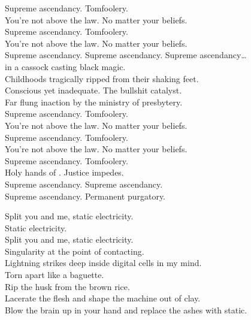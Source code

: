 Supreme ascendancy. Tomfoolery. \\
You're not above the law. No matter your beliefs. \\
Supreme ascendancy. Tomfoolery. \\
You're not above the law. No matter your beliefs. \\

Supreme ascendancy. Supreme ascendancy. Supreme ascendancy… \\

 in a cassock casting black magic. \\
Childhoods tragically ripped from their shaking feet. \\
Conscious yet inadequate. The bullshit catalyst. \\
Far flung inaction by the ministry of presbytery. \\

Supreme ascendancy. Tomfoolery. \\
You're not above the law. No matter your beliefs. \\
Supreme ascendancy. Tomfoolery. \\
You're not above the law. No matter your beliefs. \\
Supreme ascendancy. Tomfoolery. \\
Holy hands of . Justice impedes. \\

Supreme ascendancy. Supreme ascendancy. \\
Supreme ascendancy. Permanent purgatory. \\




Split you and me, static electricity. \\
Static electricity. \\
Split you and me, static electricity. \\

Singularity at the point of contacting. \\
Lightning strikes deep inside digital cells in my mind. \\
Torn apart like a baguette. \\
Rip the husk from the brown rice. \\
Lacerate the  flesh and shape the machine out of clay. \\
Blow the brain up in your hand and replace the ashes with static. \\

